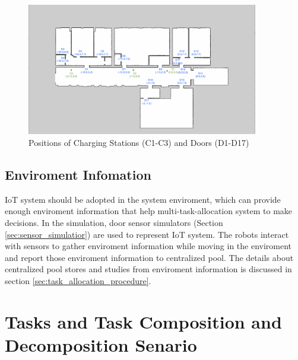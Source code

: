 \begin{figure}[htbp]
	\centering
	\includegraphics[width = 0.9\textwidth]{content/images/ch3/positions_door_station.png}
	\caption{Positions of Charging Stations (C1-C3) and Doors (D1-D17)}
	\label{fig:positions_door_station}
\end{figure}

\subsection{Enviroment Infomation}

IoT system should be adopted in the system enviroment, which can provide enough enviroment information that help multi-task-allocation system to make decisions. 
In the simulation, door sensor simulators (Section \ref{sec:sensor_simulatior}) are used to represent IoT system. The robots interact with sensors to gather enviroment information while moving in the enviroment and report those enviroment information to centralized pool.
The details about centralized pool stores and studies from enviroment information is discussed in section \ref{sec:task_allocation_procedure}.

\section{Tasks and Task Composition and Decomposition Senario}

